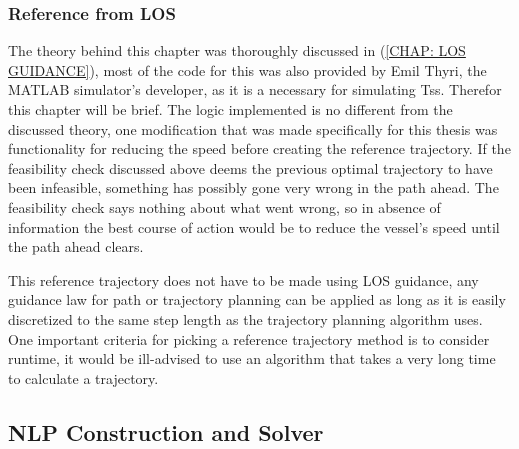 
\subsubsection*{Reference from LOS}
The theory behind this chapter was thoroughly discussed in (\ref{CHAP: LOS GUIDANCE}), most of the code for this was also provided by
Emil Thyri, the MATLAB simulator's developer, as it is a necessary for simulating \gls{Ts}s. Therefor this chapter will be brief. The logic implemented
is no different from the discussed theory, one modification that was made specifically for this thesis was functionality for reducing the speed
before creating the reference trajectory. If the feasibility check discussed above deems the previous optimal trajectory to have been infeasible, something
has possibly gone very wrong in the path ahead. The feasibility check says nothing about what went wrong, so in absence of information the best
course of action would be to reduce the vessel's speed until the path ahead clears. 

This reference trajectory does not have to be made using LOS guidance, any guidance law for path or trajectory planning can be applied as long as
it is easily discretized to the same step length as the trajectory planning algorithm uses. One important criteria for picking a reference trajectory 
method is to consider runtime, it would be ill-advised to use an algorithm that takes a very long time to calculate a trajectory.

\subsection{NLP Construction and Solver} 

